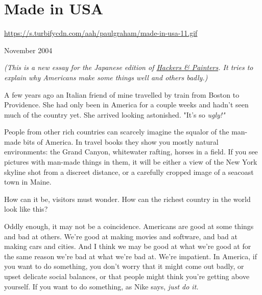 \chapter{Made in USA}


            
              
                \href{https://s.turbifycdn.com/aah/paulgraham/made-in-usa-11.gif}{https://s.turbifycdn.com/aah/paulgraham/made-in-usa-11.gif}



November 2004

\emph{(This is a new essay for the Japanese edition of
                    \href{http://www.amazon.com/exec/obidos/tg/detail/-/0596006624}{Hackers \& Painters}. It tries to explain why Americans make some things well
                    and others badly.)}

A few years ago an Italian friend of mine
                  travelled by train from Boston to Providence. She had only
                  been in America for a couple weeks and hadn't seen much of the
                  country yet. She arrived looking astonished. "It's so
                  \emph{ugly!"}

People from other rich countries can
                  scarcely imagine the squalor of the man-made bits of America.
                  In travel books they show you mostly natural environments: the
                  Grand Canyon, whitewater rafting, horses in a field. If you
                  see pictures with man-made things in them, it will be either a
                  view of the New York skyline shot from a discreet distance, or
                  a carefully cropped image of a seacoast town in Maine.

How
                  can it be, visitors must wonder. How can the richest country
                  in the world look like this?

Oddly enough, it may
                  not be a coincidence. Americans are good at some things and
                  bad at others. We're good at making movies and software, and
                  bad at making cars and cities. And I think we may be good at
                  what we're good at for the same reason we're bad at what we're
                  bad at. We're impatient. In America, if you want to do
                  something, you don't worry that it might come out badly, or
                  upset delicate social balances, or that people might think
                  you're getting above yourself. If you want to do something, as
                  Nike says, \emph{just do it.}



